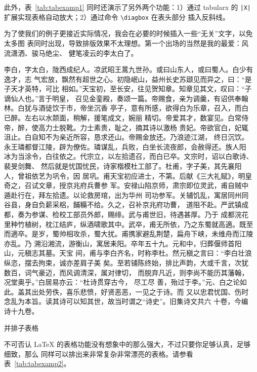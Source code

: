 此外，表~\ref{tab:tabexamp1} 同时还演示了另外两个功能：1）通过 \textsf{tabularx} 的
 \texttt{|X|} 扩展实现表格自动放大；2）通过命令 \verb|\diagbox| 在表头部分
插入反斜线。

为了使我们的例子更接近实际情况，我会在必要的时候插入一些“无关”文字，以免太多图
表同时出现，导致排版效果不太理想。第一个出场的当然是我的最爱：风流潇洒、骏马绝尘、
健笔凌云的{\heiti 李太白}了。

李白，字太白，陇西成纪人。凉武昭王暠九世孙。或曰山东人，或曰蜀人。白少有逸才，志
气宏放，飘然有超世之心。初隐岷山，益州长史苏颋见而异之，曰：“是子天才英特，可比
相如。”天宝初，至长安，往见贺知章。知章见其文，叹曰：“子谪仙人也。”言于明皇，
召见金銮殿，奏颂一篇。帝赐食，亲为调羹，有诏供奉翰林。白犹与酒徒饮于市，帝坐沉香
亭子，意有所感，欲得白为乐章，召入，而白已醉。左右以水颒面，稍解，援笔成文，婉丽
精切。帝爱其才，数宴见。白常侍帝，醉，使高力士脱靴。力士素贵，耻之，摘其诗以激杨
贵妃。帝欲官白，妃辄沮止。白自知不为亲近所容，恳求还山。帝赐金放还。乃浪迹江湖，
终日沉饮。永王璘都督江陵，辟为僚佐。璘谋乱，兵败，白坐长流夜郎，会赦得还。族人阳
冰为当涂令，白往依之。代宗立，以左拾遗召，而白已卒。文宗时，诏以白歌诗、裴旻剑舞、
然后就是忧国忧民，诗家楷模杜工部了。杜甫，字子美，其先襄阳人，曾祖依艺为巩令，因
居巩。甫天宝初应进士，不第。后献《三大礼赋》，明皇奇之，召试文章，授京兆府兵曹参
军。安禄山陷京师，肃宗即位灵武，甫自贼中遁赴行在，拜左拾遗。以论救房琯，出为华州
司功参军。关辅饥乱，寓居同州同谷县，身自负薪采梠，餔糒不给。久之，召补京兆府功曹，
道阻不赴。严武镇成都，奏为参谋、检校工部员外郎，赐绯。武与甫世旧，待遇甚厚。乃于
成都浣花里种竹植树，枕江结庐，纵酒啸歌其中。武卒，甫无所依，乃之东蜀就高適。既至
而適卒。是岁，蜀帅相攻杀，蜀大扰。甫携家避乱荆楚，扁舟下峡，未维舟而江陵亦乱。乃
溯沿湘流，游衡山，寓居耒阳。卒年五十九。元和中，归葬偃师首阳山，元稹志其墓。天宝
间，甫与李白齐名，时称李杜。然元稹之言曰：“李白壮浪纵恣，摆去拘束，诚亦差肩子美
矣。至若铺陈终始，排比声韵，大或千言，次犹数百，词气豪迈，而风调清深，属对律切，
而脱弃凡近，则李尚不能历其藩翰，况堂奥乎。”白居易亦云：“杜诗贯穿古今，  尽工尽
善，殆过于李。”元、白之论如此。盖其出处劳佚，喜乐悲愤，好贤恶恶，一见之于诗。而
又以忠君忧国、伤时念乱为本旨。读其诗可以知其世，故当时谓之“诗史”。旧集诗文共六
十卷，今编诗十九卷。

\begin{table}[htbp]
\centering
\caption{并排子表格}
\label{tab:subtable}
\end{table}

不可否认 \LaTeX{} 的表格功能没有想象中的那么强大，不过只要你足够认真，足够细致，那么
同样可以排出来非常复杂非常漂亮的表格。请参看表~\ref{tab:tabexamp2}。

